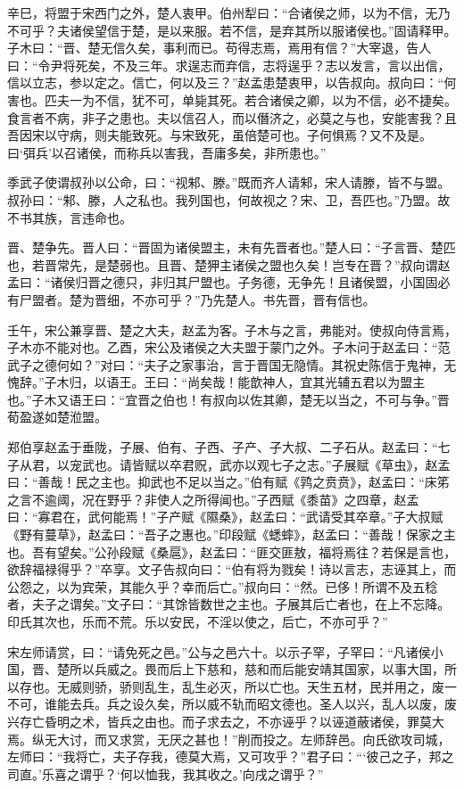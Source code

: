 \documentclass[a4paper,12pt,UTF8,twoside]{ctexbook}
\begin{document}
辛巳，将盟于宋西门之外，楚人衷甲。伯州犁曰：“合诸侯之师，以为不信，无乃不可乎？夫诸侯望信于楚，是以来服。若不信，是弃其所以服诸侯也。”固请释甲。子木曰：“晋、楚无信久矣，事利而已。苟得志焉，焉用有信？”大宰退，告人曰：“令尹将死矣，不及三年。求逞志而弃信，志将逞乎？志以发言，言以出信，信以立志，参以定之。信亡，何以及三？”赵孟患楚衷甲，以告叔向。叔向曰：“何害也。匹夫一为不信，犹不可，单毙其死。若合诸侯之卿，以为不信，必不捷矣。食言者不病，非子之患也。夫以信召人，而以僭济之，必莫之与也，安能害我？且吾因宋以守病，则夫能致死。与宋致死，虽倍楚可也。子何惧焉？又不及是。曰‘弭兵’以召诸侯，而称兵以害我，吾庸多矣，非所患也。”

季武子使谓叔孙以公命，曰：“视邾、滕。”既而齐人请邾，宋人请滕，皆不与盟。叔孙曰：“邾、滕，人之私也。我列国也，何故视之？宋、卫，吾匹也。”乃盟。故不书其族，言违命也。

晋、楚争先。晋人曰：“晋固为诸侯盟主，未有先晋者也。”楚人曰：“子言晋、楚匹也，若晋常先，是楚弱也。且晋、楚狎主诸侯之盟也久矣！岂专在晋？”叔向谓赵孟曰：“诸侯归晋之德只，非归其尸盟也。子务德，无争先！且诸侯盟，小国固必有尸盟者。楚为晋细，不亦可乎？”乃先楚人。书先晋，晋有信也。

壬午，宋公兼享晋、楚之大夫，赵孟为客。子木与之言，弗能对。使叔向侍言焉，子木亦不能对也。乙酉，宋公及诸侯之大夫盟于蒙门之外。子木问于赵孟曰：“范武子之德何如？”对曰：“夫子之家事治，言于晋国无隐情。其祝史陈信于鬼神，无愧辞。”子木归，以语王。王曰：“尚矣哉！能歆神人，宜其光辅五君以为盟主也。”子木又语王曰：“宜晋之伯也！有叔向以佐其卿，楚无以当之，不可与争。”晋荀盈遂如楚涖盟。

郑伯享赵孟于垂陇，子展、伯有、子西、子产、子大叔、二子石从。赵孟曰：“七子从君，以宠武也。请皆赋以卒君贶，武亦以观七子之志。”子展赋《草虫》，赵孟曰：“善哉！民之主也。抑武也不足以当之。”伯有赋《鹑之贲贲》，赵孟曰：“床笫之言不逾阈，况在野乎？非使人之所得闻也。”子西赋《黍苗》之四章，赵孟曰：“寡君在，武何能焉！”子产赋《隰桑》，赵孟曰：“武请受其卒章。”子大叔赋《野有蔓草》，赵孟曰：“吾子之惠也。”印段赋《蟋蟀》，赵孟曰：“善哉！保家之主也。吾有望矣。”公孙段赋《桑扈》，赵孟曰：“匪交匪敖，福将焉往？若保是言也，欲辞福禄得乎？”卒享。文子告叔向曰：“伯有将为戮矣！诗以言志，志诬其上，而公怨之，以为宾荣，其能久乎？幸而后亡。”叔向曰：“然。已侈！所谓不及五稔者，夫子之谓矣。”文子曰：“其馀皆数世之主也。子展其后亡者也，在上不忘降。印氏其次也，乐而不荒。乐以安民，不淫以使之，后亡，不亦可乎？”

宋左师请赏，曰：“请免死之邑。”公与之邑六十。以示子罕，子罕曰：“凡诸侯小国，晋、楚所以兵威之。畏而后上下慈和，慈和而后能安靖其国家，以事大国，所以存也。无威则骄，骄则乱生，乱生必灭，所以亡也。天生五材，民并用之，废一不可，谁能去兵。兵之设久矣，所以威不轨而昭文德也。圣人以兴，乱人以废，废兴存亡昏明之术，皆兵之由也。而子求去之，不亦诬乎？以诬道蔽诸侯，罪莫大焉。纵无大讨，而又求赏，无厌之甚也！”削而投之。左师辞邑。向氏欲攻司城，左师曰：“我将亡，夫子存我，德莫大焉，又可攻乎？”君子曰：“‘彼己之子，邦之司直。’乐喜之谓乎？‘何以恤我，我其收之。’向戌之谓乎？”
\end{document}
